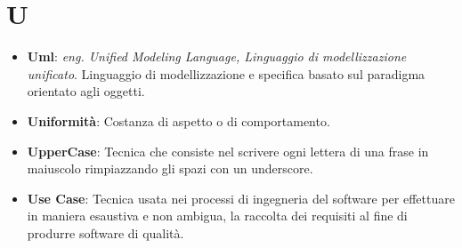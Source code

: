 \section*{U}
\begin{itemize}
	\item
	\textbf{Uml}: \textit{eng. Unified Modeling Language, Linguaggio di modellizzazione unificato}. Linguaggio di modellizzazione e specifica basato sul paradigma orientato agli oggetti.
	\item
	\textbf{Uniformità}: Costanza di aspetto o di comportamento.
	\item
	\textbf{Upper\textunderscore Case}: Tecnica che consiste nel scrivere ogni lettera di una frase in maiuscolo rimpiazzando gli spazi con un underscore.
	\item
	\textbf{Use Case}: Tecnica usata nei processi di ingegneria del software per effettuare in maniera esaustiva e non ambigua, la raccolta dei requisiti al fine di produrre software di qualità.
\end{itemize}
\newpage